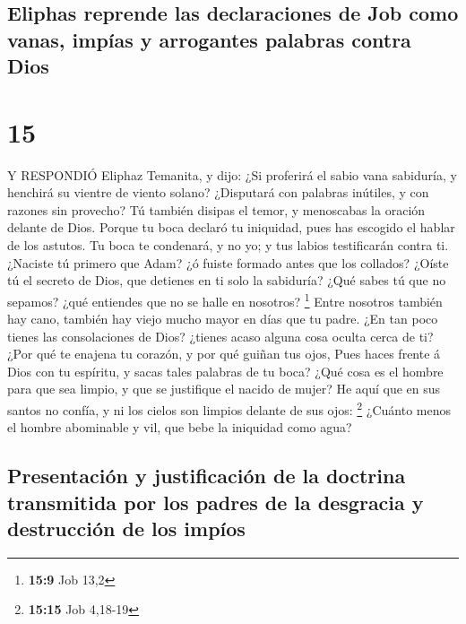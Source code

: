 \hypertarget{eliphas-reprende-las-declaraciones-de-job-como-vanas-impuxedas-y-arrogantes-palabras-contra-dios}{%
\subsection{Eliphas reprende las declaraciones de Job como vanas, impías
y arrogantes palabras contra
Dios}\label{eliphas-reprende-las-declaraciones-de-job-como-vanas-impuxedas-y-arrogantes-palabras-contra-dios}}

\hypertarget{section-14}{%
\section{15}\label{section-14}}

 Y RESPONDIÓ Eliphaz Temanita, y dijo:  ¿Si
proferirá el sabio vana sabiduría, y henchirá su vientre de viento
solano?  ¿Disputará con palabras inútiles, y con razones sin
provecho?  Tú también disipas el temor, y menoscabas la
oración delante de Dios.  Porque tu boca declaró tu
iniquidad, pues has escogido el hablar de los astutos.  Tu
boca te condenará, y no yo; y tus labios testificarán contra ti.
 ¿Naciste tú primero que Adam? ¿ó fuiste formado antes que
los collados?  ¿Oíste tú el secreto de Dios, que detienes en
ti solo la sabiduría?  ¿Qué sabes tú que no sepamos? ¿qué
entiendes que no se halle en nosotros? \footnote{\textbf{15:9} Job 13,2}
 Entre nosotros también hay cano, también hay viejo mucho
mayor en días que tu padre.  ¿En tan poco tienes las
consolaciones de Dios? ¿tienes acaso alguna cosa oculta cerca de ti?
 ¿Por qué te enajena tu corazón, y por qué guiñan tus ojos,
 Pues haces frente á Dios con tu espíritu, y sacas tales
palabras de tu boca?  ¿Qué cosa es el hombre para que sea
limpio, y que se justifique el nacido de mujer?  He aquí
que en sus santos no confía, y ni los cielos son limpios delante de sus
ojos: \footnote{\textbf{15:15} Job 4,18-19}  ¿Cuánto menos
el hombre abominable y vil, que bebe la iniquidad como agua?

\hypertarget{presentaciuxf3n-y-justificaciuxf3n-de-la-doctrina-transmitida-por-los-padres-de-la-desgracia-y-destrucciuxf3n-de-los-impuxedos}{%
\subsection{Presentación y justificación de la doctrina transmitida por
los padres de la desgracia y destrucción de los
impíos}\label{presentaciuxf3n-y-justificaciuxf3n-de-la-doctrina-transmitida-por-los-padres-de-la-desgracia-y-destrucciuxf3n-de-los-impuxedos}}

